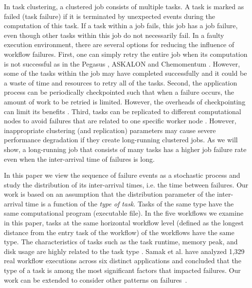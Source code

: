 \documentclass{IOS-Book-Article}
\begin{document}
In task clustering, a clustered job consists of multiple tasks. A task is marked as failed (task failure) if it is terminated by unexpected events during the computation of this task. If a task within a job fails, this job has a job failure, even though other tasks within this job do not necessarily fail. 
In a faulty execution environment, there are several options for reducing the influence of workflow failures. First, one can simply retry the entire job when its computation is not successful as in the Pegasus \cite{Deelman2004}, ASKALON \cite{fahringer2007askalon} and Chemomentum \cite{schuller2008chemomentum}. However, some of the tasks within the job may have completed successfully and it could be a waste of time and resources to retry all of the tasks. Second, the application process can be periodically checkpointed such that when a failure occurs, the amount of work to be retried is limited. However, the overheads of checkpointing can limit its benefits \cite{Zhang2004}. Third, tasks can be replicated to different computational nodes to avoid failures that are related to one specific worker node \cite{Plankensteiner2009}. However, inappropriate clustering (and replication) parameters may cause severe performance degradation if they create long-running clustered jobs. As we will show, a long-running job that consists of many tasks has a higher job failure rate even when the inter-arrival time of failures is long. 

In this paper we view the sequence of failure events as a stochastic process and study the distribution of its inter-arrival times, i.e. the time between failures. Our work is based on an assumption that the distribution parameter of the inter-arrival time is a function of the \emph{type of task}. Tasks of the same type have the same computational program (executable file). In the five workflows we examine in this paper, tasks at the same horizontal workflow level (defined as the longest distance from the entry task of the workflow) of the workflows have the same type. 
The characteristics of tasks such as the task runtime, memory peak, and disk usage are highly related to the task type \cite{da2013toward, Juve2013}.
Samak \cite{Samak2011} et al. have analyzed 1,329 real workflow executions across six distinct applications and concluded that the type of a task is among the most significant factors that impacted failures. Our work can be extended to consider other patterns on failures~\cite{Sahoo2004}. 
\end{document}
